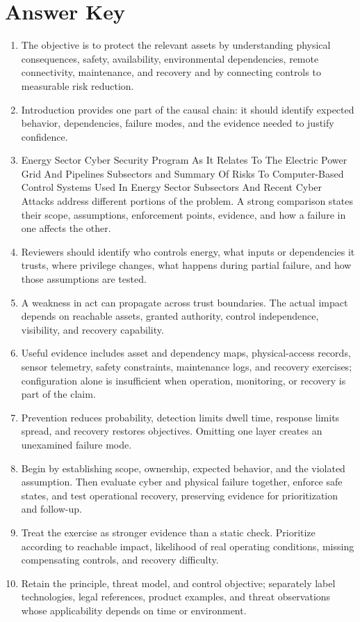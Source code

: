 \documentclass[11pt]{article}
\begin{document}
\section*{Answer Key}
\begin{enumerate}
\item The objective is to protect the relevant assets by understanding physical consequences, safety, availability, environmental dependencies, remote connectivity, maintenance, and recovery and by connecting controls to measurable risk reduction.
\item Introduction provides one part of the causal chain: it should identify expected behavior, dependencies, failure modes, and the evidence needed to justify confidence.
\item Energy Sector Cyber Security Program As It Relates To The Electric Power Grid And Pipelines Subsectors and Summary Of Risks To Computer-Based Control Systems Used In Energy Sector Subsectors And Recent Cyber Attacks address different portions of the problem. A strong comparison states their scope, assumptions, enforcement points, evidence, and how a failure in one affects the other.
\item Reviewers should identify who controls energy, what inputs or dependencies it trusts, where privilege changes, what happens during partial failure, and how those assumptions are tested.
\item A weakness in act can propagate across trust boundaries. The actual impact depends on reachable assets, granted authority, control independence, visibility, and recovery capability.
\item Useful evidence includes asset and dependency maps, physical-access records, sensor telemetry, safety constraints, maintenance logs, and recovery exercises; configuration alone is insufficient when operation, monitoring, or recovery is part of the claim.
\item Prevention reduces probability, detection limits dwell time, response limits spread, and recovery restores objectives. Omitting one layer creates an unexamined failure mode.
\item Begin by establishing scope, ownership, expected behavior, and the violated assumption. Then evaluate cyber and physical failure together, enforce safe states, and test operational recovery, preserving evidence for prioritization and follow-up.
\item Treat the exercise as stronger evidence than a static check. Prioritize according to reachable impact, likelihood of real operating conditions, missing compensating controls, and recovery difficulty.
\item Retain the principle, threat model, and control objective; separately label technologies, legal references, product examples, and threat observations whose applicability depends on time or environment.
\end{enumerate}
\end{document}
